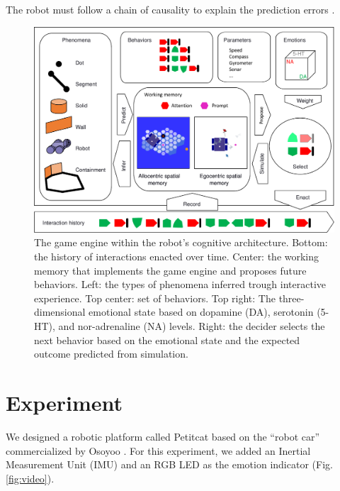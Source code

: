 \documentclass[runningheads]{llncs}
\begin{document}
The robot must follow a chain of causality to explain the prediction errors \cite{thorisson_explanation_2021}.

\begin{figure}
	\includegraphics[width=\textwidth]{Figure_geith.pdf}
	\caption{The game engine within the robot's cognitive architecture.
	Bottom: the history of interactions enacted over time.
	Center: the working memory that implements the game engine and proposes future behaviors.
	Left: the types of phenomena inferred trough interactive experience.
	Top center: set of behaviors.
	Top right: The three-dimensional emotional state based on dopamine (DA), serotonin (5-HT), and nor-adrenaline (NA) levels.
	Right: the decider selects the next behavior based on the emotional state and the expected outcome predicted from simulation.} \label{fig:geith}
\end{figure}



\section{Experiment}
\label{sec:expe}

We designed a robotic platform called Petitcat based on the ``robot car'' commercialized by Osoyoo \cite{osoyoo_robot_car}.
For this experiment, we added an Inertial Measurement Unit (IMU) and an RGB LED as the emotion indicator (Fig. \ref{fig:video}). 
\end{document}
